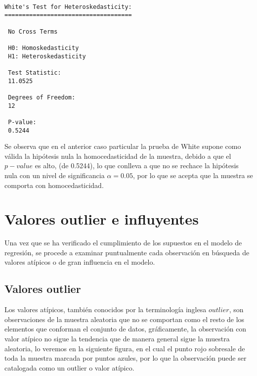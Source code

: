 \documentclass[a4paper,oneside,openany]{book}
\begin{document}
\begin{verbatim}

White's Test for Heteroskedasticity:
==================================== 

 No Cross Terms

 H0: Homoskedasticity
 H1: Heteroskedasticity

 Test Statistic:
 11.0525 

 Degrees of Freedom:
 12 

 P-value:
 0.5244 
\end{verbatim}

Se observa que en el anterior caso particular la prueba de White supone
como válida la hipótesis nula la homocedasticidad de la muestra, debido
a que el \(p-value\) es alto, (de 0.5244), lo que conlleva a que no se
rechace la hipótesis nula con un nivel de significancia \(\alpha=0.05\),
por lo que se acepta que la muestra se comporta con homocedasticidad.

\section{Valores outlier e
influyentes}\label{valores-outlier-e-influyentes}

Una vez que se ha verificado el cumplimiento de los supuestos en el
modelo de regresión, se procede a examinar puntualmente cada observación
en búsqueda de valores atípicos o de gran influencia en el modelo.

\subsection{Valores outlier}\label{valores-outlier}

Los valores atípicos, también conocidos por la terminología inglesa
\(outlier\), son observaciones de la muestra aleatoria que no se
comportan como el resto de los elementos que conforman el conjunto de
datos, gráficamente, la observación con valor atípico no sigue la
tendencia que de manera general sigue la muestra aleatoria, lo veremos
en la siguiente figura, en el cual el punto rojo sobresale de toda la
muestra marcada por puntos azules, por lo que la observación puede ser
catalogada como un outlier o valor atípico.
\end{document}
